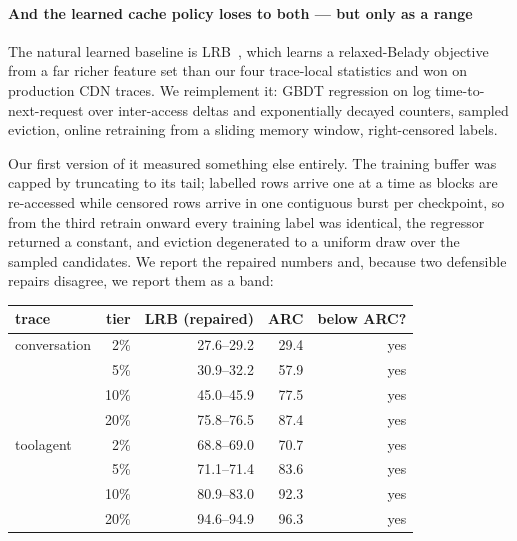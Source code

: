 \paragraph{And the learned cache policy loses to both --- but only as a range} The natural learned
baseline is LRB~\cite{S6_song2020lrb}, which learns a relaxed-Belady objective from
a far richer feature set than our four trace-local statistics and won on production CDN traces. We
reimplement it: GBDT regression on log time-to-next-request over inter-access deltas and exponentially
decayed counters, sampled eviction, online retraining from a sliding memory window, right-censored
labels.

Our first version of it measured something else entirely. The training buffer was capped by truncating to
its tail; labelled rows arrive one at a time as blocks are re-accessed while censored rows arrive in one
contiguous burst per checkpoint, so from the third retrain onward every training label was identical, the
regressor returned a constant, and eviction degenerated to a uniform draw over the sampled candidates.
We report the repaired numbers and, because two defensible repairs disagree, we report them as a band:

\begin{center}\small
\begin{tabular}{@{}lrrrr@{}}
\toprule
trace & tier & LRB (repaired) & ARC & below ARC? \\
\midrule
conversation & 2\%  & 27.6--29.2 & 29.4 & yes \\
             & 5\%  & 30.9--32.2 & 57.9 & yes \\
             & 10\% & 45.0--45.9 & 77.5 & yes \\
             & 20\% & 75.8--76.5 & 87.4 & yes \\
\midrule
toolagent    & 2\%  & 68.8--69.0 & 70.7 & yes \\
             & 5\%  & 71.1--71.4 & 83.6 & yes \\
             & 10\% & 80.9--83.0 & 92.3 & yes \\
             & 20\% & 94.6--94.9 & 96.3 & yes \\
\bottomrule
\end{tabular}
\end{center}

